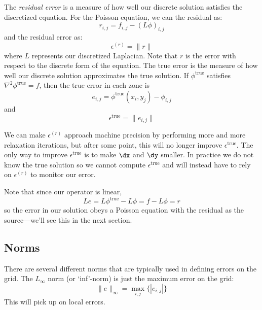 The {\em residual error} is a measure of how well our discrete solution
satisfies the discretized equation.  For the Poisson equation, we
can the residual as:
\begin{equation}
r_{i,j} = f_{i,j} - (L \phi)_{i,j} 
\end{equation}
and the residual error as:
\begin{equation}
\epsilon^{(r)} = \| r \|
\end{equation}
where $L$ represents our discretized Laplacian.  Note that $r$ is the
error with respect to the discrete form of the equation.  The true
error is the measure of how well our discrete solution approximates
the true solution.  If $\phi^\mathrm{true}$ satisfies $\nabla^2
\phi^\mathrm{true} = f$, then the true error in each zone is
\begin{equation}
e_{i,j} = \phi^\mathrm{true}(x_i,y_j) - \phi_{i,j} 
\end{equation}
and
\begin{equation}
\epsilon^\mathrm{true} = \| e_{i,j} \|
\end{equation}

We can make $\epsilon^{(r)}$ approach machine precision by performing
more and more relaxation iterations, but after some point, this will
no longer improve $\epsilon^\mathrm{true}$.  The only way to improve
$\epsilon^\mathrm{true}$ is to make $\dx$ and $\dy$ smaller.
In practice we do not know the true solution so we cannot compute
$\epsilon^\mathrm{true}$ and will instead have to rely on
$\epsilon^{(r)}$ to monitor our error.

Note that since our operator is linear,
\begin{equation}
L e = L\phi^\mathrm{true} - L\phi = f - L\phi = r
\end{equation}
so the error in our solution obeys a Poisson equation with the residual
as the source---we'll see this in the next section.

\subsection{Norms}

There are several different norms that are typically used in defining
errors on the grid.  The $L_\infty$ norm (or `inf'-norm) is just the
maximum error on the grid:
\begin{equation}
\|e\|_\infty = \max_{i,j} \{ |e_{i,j}| \}
\end{equation}
This will pick up on local errors.  

